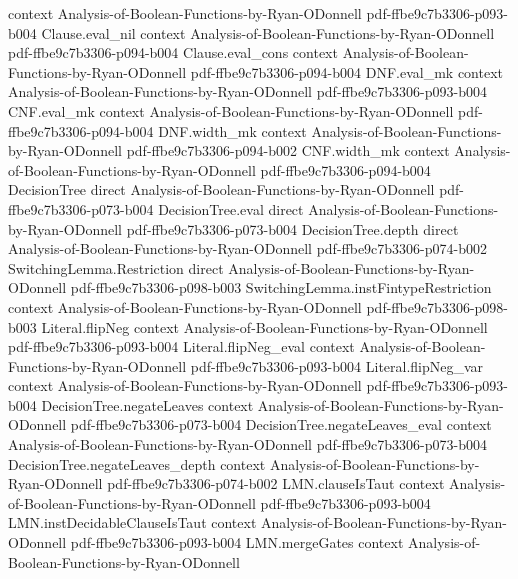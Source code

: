 \begin{lemma}
  {context}
  {Analysis-of-Boolean-Functions-by-Ryan-ODonnell}
  {pdf-ffbe9c7b3306-p093-b004}
\proofstep
  {Clause.eval_nil}
  {context}
  {Analysis-of-Boolean-Functions-by-Ryan-ODonnell}
  {pdf-ffbe9c7b3306-p094-b004}
\proofstep
  {Clause.eval_cons}
  {context}
  {Analysis-of-Boolean-Functions-by-Ryan-ODonnell}
  {pdf-ffbe9c7b3306-p094-b004}
\proofstep
  {DNF.eval_mk}
  {context}
  {Analysis-of-Boolean-Functions-by-Ryan-ODonnell}
  {pdf-ffbe9c7b3306-p093-b004}
\proofstep
  {CNF.eval_mk}
  {context}
  {Analysis-of-Boolean-Functions-by-Ryan-ODonnell}
  {pdf-ffbe9c7b3306-p094-b004}
\proofstep
  {DNF.width_mk}
  {context}
  {Analysis-of-Boolean-Functions-by-Ryan-ODonnell}
  {pdf-ffbe9c7b3306-p094-b002}
\proofstep
  {CNF.width_mk}
  {context}
  {Analysis-of-Boolean-Functions-by-Ryan-ODonnell}
  {pdf-ffbe9c7b3306-p094-b004}
\proofstep
  {DecisionTree}
  {direct}
  {Analysis-of-Boolean-Functions-by-Ryan-ODonnell}
  {pdf-ffbe9c7b3306-p073-b004}
\proofstep
  {DecisionTree.eval}
  {direct}
  {Analysis-of-Boolean-Functions-by-Ryan-ODonnell}
  {pdf-ffbe9c7b3306-p073-b004}
\proofstep
  {DecisionTree.depth}
  {direct}
  {Analysis-of-Boolean-Functions-by-Ryan-ODonnell}
  {pdf-ffbe9c7b3306-p074-b002}
\proofstep
  {SwitchingLemma.Restriction}
  {direct}
  {Analysis-of-Boolean-Functions-by-Ryan-ODonnell}
  {pdf-ffbe9c7b3306-p098-b003}
\proofstep
  {SwitchingLemma.instFintypeRestriction}
  {context}
  {Analysis-of-Boolean-Functions-by-Ryan-ODonnell}
  {pdf-ffbe9c7b3306-p098-b003}
\proofstep
  {Literal.flipNeg}
  {context}
  {Analysis-of-Boolean-Functions-by-Ryan-ODonnell}
  {pdf-ffbe9c7b3306-p093-b004}
\proofstep
  {Literal.flipNeg_eval}
  {context}
  {Analysis-of-Boolean-Functions-by-Ryan-ODonnell}
  {pdf-ffbe9c7b3306-p093-b004}
\proofstep
  {Literal.flipNeg_var}
  {context}
  {Analysis-of-Boolean-Functions-by-Ryan-ODonnell}
  {pdf-ffbe9c7b3306-p093-b004}
\proofstep
  {DecisionTree.negateLeaves}
  {context}
  {Analysis-of-Boolean-Functions-by-Ryan-ODonnell}
  {pdf-ffbe9c7b3306-p073-b004}
\proofstep
  {DecisionTree.negateLeaves_eval}
  {context}
  {Analysis-of-Boolean-Functions-by-Ryan-ODonnell}
  {pdf-ffbe9c7b3306-p073-b004}
\proofstep
  {DecisionTree.negateLeaves_depth}
  {context}
  {Analysis-of-Boolean-Functions-by-Ryan-ODonnell}
  {pdf-ffbe9c7b3306-p074-b002}
\proofstep
  {LMN.clauseIsTaut}
  {context}
  {Analysis-of-Boolean-Functions-by-Ryan-ODonnell}
  {pdf-ffbe9c7b3306-p093-b004}
\proofstep
  {LMN.instDecidableClauseIsTaut}
  {context}
  {Analysis-of-Boolean-Functions-by-Ryan-ODonnell}
  {pdf-ffbe9c7b3306-p093-b004}
\proofstep
  {LMN.mergeGates}
  {context}
  {Analysis-of-Boolean-Functions-by-Ryan-ODonnell}

\end{lemma}
